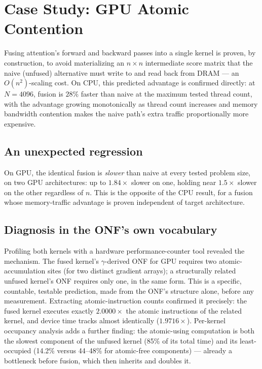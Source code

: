 \documentclass[sigconf,review,anonymous]{acmart}
\begin{document}
\section{Case Study: GPU Atomic Contention}
\label{sec:atomic}

Fusing attention's forward and backward passes into a single kernel is
proven, by construction, to avoid materializing an $n\times n$
intermediate score matrix that the naive (unfused) alternative must
write to and read back from DRAM --- an $O(n^2)$-scaling cost. On CPU,
this predicted advantage is confirmed directly: at $N=4096$, fusion is
$28\%$ faster than naive at the maximum tested thread count, with the
advantage growing monotonically as thread count increases and memory
bandwidth contention makes the naive path's extra traffic
proportionally more expensive.

\subsection{An unexpected regression}

On GPU, the identical fusion is \emph{slower} than naive at every
tested problem size, on two GPU architectures: up to $1.84\times$
slower on one, holding near $1.5\times$ slower on the other regardless
of $n$. This is the opposite of the CPU result, for a fusion whose
memory-traffic advantage is proven independent of target architecture.

\subsection{Diagnosis in the ONF's own vocabulary}

Profiling both kernels with a hardware performance-counter tool
revealed the mechanism. The fused kernel's $\gamma$-derived ONF for
GPU requires two atomic-accumulation sites (for two distinct gradient
arrays); a structurally related unfused kernel's ONF requires only
one, in the same form. This is a specific, countable, testable
prediction, made from the ONF's structure alone, before any
measurement. Extracting atomic-instruction counts confirmed it
precisely: the fused kernel executes exactly $2.0000\times$ the
atomic instructions of the related kernel, and device time tracks
almost identically ($1.9716\times$). Per-kernel occupancy analysis
adds a further finding: the atomic-using computation is both the
slowest component of the unfused kernel (85\% of its total time) and
its least-occupied (14.2\% versus 44--48\% for atomic-free components)
--- already a bottleneck before fusion, which then inherits and
doubles it.
\end{document}
